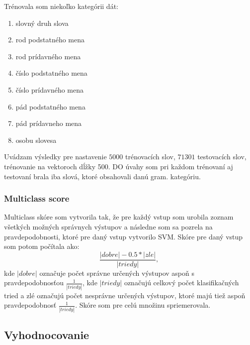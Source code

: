\documentclass[12pt]{article}
\begin{document}
Trénovala som niekoľko kategórii dát:
\begin{enumerate}
\item slovný druh slova
\item rod podstatného mena
\item rod prídavného mena
\item číslo podstatného mena
\item číslo prídavného mena
\item pád podstatného mena
\item pád prídavneho mena
\item osobu slovesa\
\end{enumerate}
Uvádzam výsledky pre nastavenie $5000$ trénovacích slov, $71301$ testovacích slov, trénovanie na vektoroch dĺžky 500. DO úvahy som pri každom trénovaní aj testovaní brala iba slová, ktoré obsahovali danú gram. kategóriu.


\subsubsection{Multiclass score}
Multiclass skóre som vytvorila tak, že pre každý vstup som urobila zoznam všetkých možných správnych výstupov a následne som sa pozrela na pravdepodobnosti, ktoré pre daný vstup vytvorilo SVM. Skóre pre daný vstup som potom počítala ako:
\[\frac{|dobre|-0.5*|zle|}{|triedy|},\]
kde $|dobre|$ označuje počet správne určených výstupov aspoň s pravdepodobnosťou $\frac{1}{|triedy|}$, kde $|triedy|$ označujú celkový počet klasifikačných tried a zlé označujú počet nesprávne určených výstupov, ktoré majú tiež aspoň pravdepodobnosť $\frac{1}{|triedy|}$. Skóre som pre celú množinu spriemerovala. 
\subsection{Vyhodnocovanie}
\end{document}
